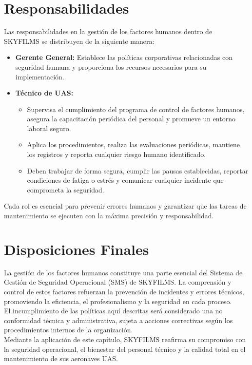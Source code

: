 \section{Responsabilidades}

Las responsabilidades en la gestión de los factores humanos dentro de SKYFILMS se distribuyen de la siguiente manera:

\begin{itemize}
    \item \textbf{Gerente General:} Establece las políticas corporativas relacionadas con seguridad humana y proporciona los recursos necesarios para su implementación.

    \item \textbf{Técnico de UAS:}
        \begin{itemize}
            \item Supervisa el cumplimiento del programa de control de factores humanos, asegura la capacitación periódica del personal y promueve un entorno laboral seguro.

            \item Aplica los procedimientos, realiza las evaluaciones periódicas, mantiene los registros y reporta cualquier riesgo humano identificado.

            \item Deben trabajar de forma segura, cumplir las pausas establecidas, reportar condiciones de fatiga o estrés y comunicar cualquier incidente que comprometa la seguridad.
        \end{itemize}

\end{itemize}

Cada rol es esencial para prevenir errores humanos y garantizar que las tareas de mantenimiento se ejecuten con la máxima precisión y responsabilidad.

\section{Disposiciones Finales}
La gestión de los factores humanos constituye una parte esencial del Sistema de Gestión de Seguridad Operacional (SMS) de SKYFILMS. La comprensión y control de estos factores refuerzan la prevención de incidentes y errores técnicos, promoviendo la eficiencia, el profesionalismo y la seguridad en cada proceso.\\

El incumplimiento de las políticas aquí descritas será considerado una no conformidad técnica y administrativa, sujeta a acciones correctivas según los procedimientos internos de la organización.\\

Mediante la aplicación de este capítulo, SKYFILMS reafirma su compromiso con la seguridad operacional, el bienestar del personal técnico y la calidad total en el mantenimiento de sus aeronaves UAS.